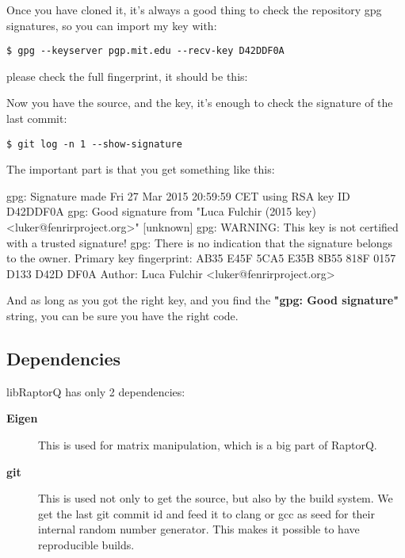 \documentclass[11pt,a4paper]{refart}
\begin{document}
Once you have cloned it, it's always a good thing to check the repository gpg
signatures, so you can import my key with:

\begin{verbatim}
$ gpg --keyserver pgp.mit.edu --recv-key D42DDF0A
\end{verbatim}

please check the full fingerprint, it should be this:

\theverbbox
 

Now you have the source, and the key, it's enough to check the signature of the
last commit:

\begin{verbatim}
$ git log -n 1 --show-signature
\end{verbatim}

The important part is that you get something like this:

\begin{verbbox}[\footnotesize]
 gpg: Signature made Fri 27 Mar 2015 20:59:59 CET using RSA key ID D42DDF0A
 gpg: Good signature from "Luca Fulchir (2015 key) <luker@fenrirproject.org>"
 [unknown]
 gpg: WARNING: This key is not certified with a trusted signature!
 gpg:          There is no indication that the signature belongs to the owner.
 Primary key fingerprint: AB35 E45F 5CA5 E35B 8B55  818F 0157 D133 D42D DF0A
 Author: Luca Fulchir <luker@fenrirproject.org>
\end{verbbox}
\theverbbox

And as long as you got the right key, and you find the \textbf{"gpg: Good signature"} string,
you can be sure you have the right code.

\subsection{Dependencies}

libRaptorQ has only 2 dependencies:
\begin{description}
\item[\textbf{Eigen}] This is used for matrix manipulation, which is a big part of RaptorQ.
\item[\textbf{git}] This is used not only to get the source, but also by the build system. We get the last git commit id and feed it to clang or gcc as seed for their internal
random number generator. This makes it possible to have reproducible builds.
\end{description}
\end{document}
